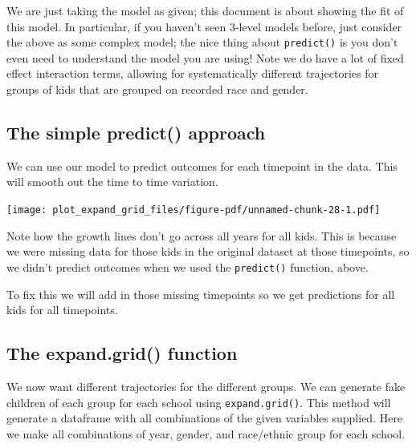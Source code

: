 \documentclass[
  letterpaper,
  DIV=11,
  numbers=noendperiod]{scrreprt}
\newenvironment{Shaded}{}{}
\newcommand{\AttributeTok}[1]{\textcolor[rgb]{0.49,0.56,0.16}{#1}}
\newcommand{\FloatTok}[1]{\textcolor[rgb]{0.25,0.63,0.44}{#1}}
\newcommand{\FunctionTok}[1]{\textcolor[rgb]{0.02,0.16,0.49}{#1}}
\newcommand{\NormalTok}[1]{#1}
\newcommand{\OtherTok}[1]{\textcolor[rgb]{0.00,0.44,0.13}{#1}}
\newcommand{\SpecialCharTok}[1]{\textcolor[rgb]{0.25,0.44,0.63}{#1}}
\begin{document}
We are just taking the model as given; this document is about showing
the fit of this model. In particular, if you haven't seen 3-level models
before, just consider the above as some complex model; the nice thing
about \texttt{predict()} is you don't even need to understand the model
you are using! Note we do have a lot of fixed effect interaction terms,
allowing for systematically different trajectories for groups of kids
that are grouped on recorded race and gender.

\subsection{The simple predict()
approach}\label{the-simple-predict-approach}

We can use our model to predict outcomes for each timepoint in the data.
This will smooth out the time to time variation.

\begin{Shaded}
\end{Shaded}

\texttt{[image: plot\_expand\_grid\_files/figure-pdf/unnamed-chunk-28-1.pdf]}

Note how the growth lines don't go across all years for all kids. This
is because we were missing data for those kids in the original dataset
at those timepoints, so we didn't predict outcomes when we used the
\texttt{predict()} function, above.

To fix this we will add in those missing timepoints so we get
predictions for all kids for all timepoints.

\subsection{The expand.grid() function}\label{the-expand.grid-function}

We now want different trajectories for the different groups. We can
generate fake children of each group for each school using
\texttt{expand.grid()}. This method will generate a dataframe with all
combinations of the given variables supplied. Here we make all
combinations of year, gender, and race/ethnic group for each school.
\end{document}
